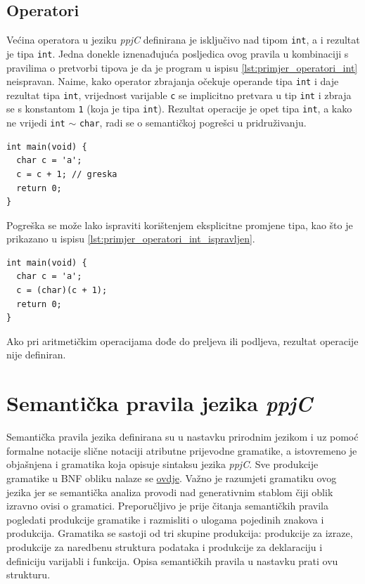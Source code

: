 \documentclass[times, 12pt, utf8]{book}
\begin{document}
\subsection{Operatori}
Većina operatora u jeziku \emph{ppjC} definirana je isključivo nad tipom \verb|int|, a i rezultat je tipa \verb|int|.
Jedna donekle iznenađujuća posljedica ovog pravila u kombinaciji s pravilima o pretvorbi tipova je da je program u ispisu \ref{lst:primjer_operatori_int} neispravan.
Naime, kako operator zbrajanja očekuje operande tipa \verb|int| i daje rezultat tipa \verb|int|, vrijednost varijable \verb|c| se implicitno pretvara u tip \verb|int| i zbraja se s konstantom \verb|1| (koja je tipa \verb|int|).
Rezultat operacije je opet tipa \verb|int|, a kako ne vrijedi \verb|int| \(\sim\) \verb|char|, radi se o semantičkoj pogrešci u pridruživanju.

\begin{lstlisting}[caption={Neispravan program s operatorom zbrajanja.},label=lst:primjer_operatori_int]
int main(void) {
  char c = 'a';
  c = c + 1; // greska
  return 0;
}
\end{lstlisting}

Pogreška se može lako ispraviti korištenjem eksplicitne promjene tipa, kao što je prikazano u ispisu \ref{lst:primjer_operatori_int_ispravljen}.

\begin{lstlisting}[caption={Ispravljen program iz ispisa \ref{lst:primjer_operatori_int}.},label=lst:primjer_operatori_int_ispravljen]
int main(void) {
  char c = 'a';
  c = (char)(c + 1);
  return 0;
}
\end{lstlisting}

Ako pri aritmetičkim operacijama dođe do preljeva ili podljeva, rezultat operacije nije definiran.

\section{Semantička pravila jezika \emph{ppjC}}\label{sec:semanticka_pravila}
Semantička pravila jezika definirana su u nastavku prirodnim jezikom i uz pomoć formalne notacije slične notaciji atributne prijevodne gramatike, a istovremeno je objašnjena i gramatika koja opisuje sintaksu jezika \emph{ppjC}.
Sve produkcije gramatike u BNF obliku nalaze se \href{https://github.com/fer-ppj/ppj-labosi/raw/master/res/lab3/bnf.txt}{ovdje}.
Važno je razumjeti gramatiku ovog jezika jer se semantička analiza provodi nad generativnim stablom čiji oblik izravno ovisi o gramatici.
Preporučljivo je prije čitanja semantičkih pravila pogledati produkcije gramatike i razmisliti o ulogama pojedinih znakova i produkcija.
Gramatika se sastoji od tri skupine produkcija: produkcije za izraze, produkcije za naredbenu struktura podataka i produkcije za deklaraciju i definiciju varijabli i funkcija.
Opisa semantičkih pravila u nastavku prati ovu strukturu.
\end{document}
